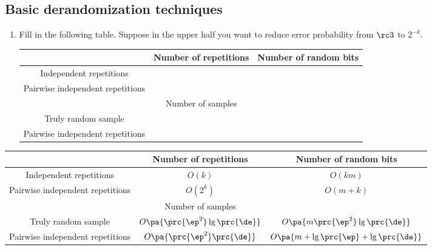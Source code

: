 \subsection{Basic derandomization techniques}
\begin{enumerate}
\item
Fill in the following table. Suppose in the upper half you want to reduce error probability from $\rc3$ to $2^{-k}$.

\begin{tabular}{|c|c|c|}
\hline 
 & Number of repetitions & Number of random bits\tabularnewline
\hline 
Independent repetitions &  & \tabularnewline
\hline 
Pairwise independent repetitions &  & \tabularnewline
\hline 
 & Number of samples & \tabularnewline
\hline 
Truly random sample &  & \tabularnewline
\hline 
Pairwise independent repetitions &  & \tabularnewline
\hline 
\end{tabular}

\end{enumerate}

\begin{tabular}{|c|c|c|}
\hline 
 & Number of repetitions & Number of random bits\tabularnewline
\hline 
Independent repetitions & $O(k)$ & $O(km)$\tabularnewline
\hline 
Pairwise independent repetitions & $O(2^{k})$ & $O(m+k)$\tabularnewline
\hline 
 & Number of samples & \tabularnewline
\hline 
Truly random sample & $O\pa{\prc{\ep^2}\lg\prc{\de}}$ & $ O\pa{m\prc{\ep^2}\lg\prc{\de}} $\tabularnewline
\hline 
Pairwise independent repetitions & $ O\pa{\prc{\ep^2}\prc{\de}}$ & $O\pa{m+\lg\prc{\ep}+\lg\prc{\de}}$\tabularnewline
\hline 
\end{tabular}

%
%
